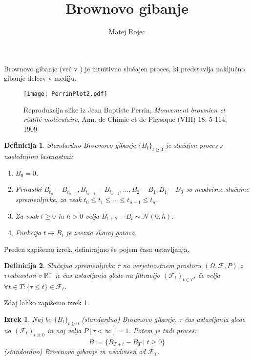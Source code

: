 \documentclass[11pt]{article}
\title{Brownovo gibanje}
\author{Matej Rojec}
\newtheorem{definicija}{Definicija}}
\newtheorem{izrek}{Izrek}}
\newcommand{\f}{\mathcal{F}}
\begin{document}
    \maketitle
    Brownovo gibanje (več v \cite{karatzas1991brownian}) je intuitivno slučajen proces,  %
    ki predstavlja naključno gibanje delcev v mediju.
    \begin{figure}[h]
        \centering
        \texttt{[image: PerrinPlot2.pdf]}
        \caption{Reprodukcija slike iz Jean Baptiste Perrin, \emph{Mouvement brownien et réalité moléculaire}, Ann. de Chimie et de Physique (VIII) 18, 5-114, 1909}
    \end{figure} 


    \begin{definicija}
        Standardno Brownovo gibanje $\{B_t\}_{t \geq 0}$ je slučajen proces z naslednjimi lastnostmi: 
       \begin{enumerate}
        \item $B_0 = 0$.
        \item Prirastki $B_{t_n} - B_{t_{n-1}}, B_{t_{n-1}} - B_{t_{n-2}}, \ldots, B_2 - B_1, B_1 - B_0$ so neodvisne slučajne spremenljivke, za vsak $t_0 \leq t_1 \leq \cdots \leq t_{n-1} \leq t_n$.
        \item Za vsak $t \geq 0$ in $h > 0$ velja $B_{t+h} - B_t \sim \mathcal{N}(0, h)$.
        \item Funkcija $t \mapsto B_t$ je zvezna skoraj gotovo.
       \end{enumerate} 
    \end{definicija}
    
    Preden zapišemo izrek, definirajmo še pojem časa ustavljanja.
    
    \begin{definicija}
        Slučajna spremenljivka $\tau$ na verjetnostnem prostoru $(\Omega, \f, P)$ z vrednostmi v $\mathbb{R}^+$
        je \emph{čas ustavljanja} glede na filtracijo $(\f_t)_{t\in T}$, če velja $\forall t \in T: \{\tau \leq t\} \in \f_t$.
    \end{definicija}
    
    Zdaj lahko zapišemo izrek 1. %
    \begin{izrek}
        Naj bo $\{B_t\}_{t \geq 0}$ (standardno) Brownovo gibanje, $\tau$ čas ustavljanja glede na 
        $(\f_t)_{t\geq 0}$ in naj velja $P[\tau < \infty] = 1$.
        Potem je tudi proces:
        \[
        \hat{B} := \{B_{T+t} - B_T \mid t \geq 0\}
        \]
        (standardno) Brownovo gibanje in neodvisen od $\f_T$.
    \end{izrek}
    
    
    
    \printindex
\end{document}
